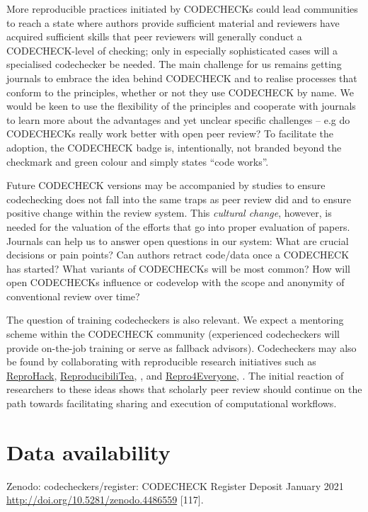 \documentclass[12pt]{article}
\begin{document}
More reproducible practices initiated by CODECHECKs could lead
communities to reach a state where authors provide sufficient material
and reviewers have acquired sufficient skills that peer reviewers will
generally conduct a CODECHECK-level of checking; only in especially
sophisticated cases will a specialised codechecker be needed.  The
main challenge for us remains getting journals to embrace the idea
behind CODECHECK and to realise processes that conform to the
principles, whether or not they use CODECHECK by name.  We would be
keen to use the flexibility of the principles and cooperate with
journals to learn more about the advantages and yet unclear specific
challenges -- e.g do CODECHECKs really work better with open peer review?  To
facilitate the adoption, the CODECHECK badge is, intentionally, not
branded beyond the checkmark and green colour and simply states ``code
works''.

Future CODECHECK versions may be accompanied by studies to ensure
codechecking does not fall into the same traps as peer review did
\cite{tennant_limitations_2020} and to ensure positive change within
the review system.  This \emph{cultural change}, however, is needed
for the valuation of the efforts that go into proper evaluation of
papers.  Journals can help us to answer open questions in our system: What are
crucial decisions or pain points? Can authors retract code/data once a
CODECHECK has started?  What variants of CODECHECKs will be most
common? How will open CODECHECKs influence or codevelop with the scope
and anonymity of conventional review over time?

The question of training codecheckers is also relevant. We expect a
mentoring scheme within the CODECHECK community (experienced
codecheckers will provide on-the-job training or serve as fallback
advisors). Codecheckers may also be found by collaborating with
reproducible research initiatives such as
\href{https://reprohack.github.io/reprohack-hq/}{ReproHack},
\href{https://reproducibilitea.org/}{ReproducibiliTea},
\cite{fitzgibbon_brewing_2020}, and
\href{https://repro4everyone.org/}{Repro4Everyone},
\cite{auer_reproducibility_2020}.  The initial reaction of 
researchers to these ideas shows that scholarly peer review
should continue on the path towards facilitating sharing and
execution of computational workflows.



\section*{Data availability}
Zenodo: codecheckers/register: CODECHECK Register Deposit January 2021 \url{http://doi.org/10.5281/zenodo.4486559} [117].
\end{document}

